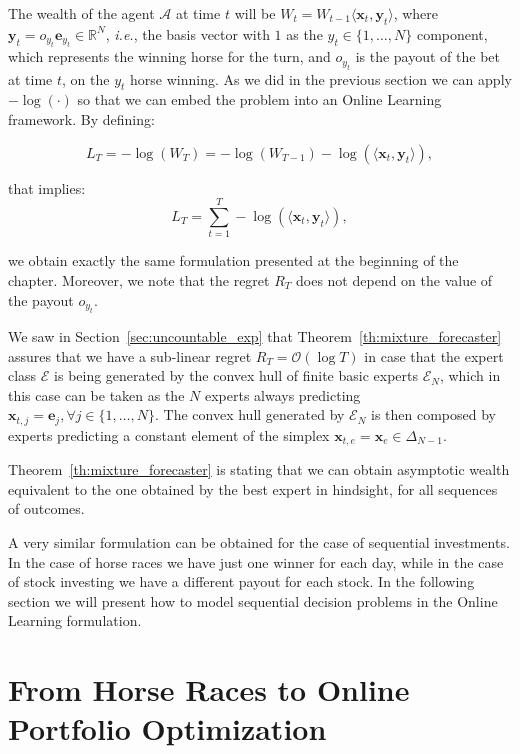 The wealth of the agent $\mathcal A$ at time $t$ will be $W_t=W_{t-1}\langle \mathbf x_t, \mathbf y_t \rangle$, where $\mathbf y_t=o_{y_t}\mathbf e_{y_t}\in\mathbb R^N$, \emph{i.e.}, the basis vector with $1$ as the $y_t\in\{1,\ldots,N\}$ component, which represents the winning horse for the turn, and $o_{y_t}$ is the payout of the bet at time $t$, on the $y_t$ horse winning. As we did in the previous section we can apply $-\log(\cdot)$ so that we can embed the problem into an Online Learning framework. By defining: 

$$L_T=-\log(W_T)=-\log(W_{T-1})-\log(\langle \mathbf x_t,\mathbf y_t\rangle),$$

that implies:
\begin{equation}\label{eq:log_loss_hr}
L_T=\sum\limits_{t=1}^T-\log(\langle \mathbf x_t,\mathbf y_t\rangle),
\end{equation}

we obtain exactly the same formulation presented at the beginning of the chapter. Moreover, we note that the regret $R_T$ does not 
depend on the value of the payout $o_{y_t}$. 

We saw in Section~\ref{sec:uncountable_exp} that Theorem~\ref{th:mixture_forecaster} assures that we have a sub-linear regret $R_T=\mathcal O(\log T)$ in case that the expert class $\mathcal E$ is being generated by the convex hull of finite basic experts $\mathcal E_N$, which in this case can be taken as the $N$ experts always predicting $\mathbf x_{t,j}=\mathbf e_j, \forall j\in\{1,\ldots,N\}$. The convex hull generated by $\mathcal E_N$ is then composed by experts predicting a constant element of the simplex $\mathbf x_{t,e}=\mathbf x_e\in \Delta_{N-1}$. 

Theorem~\ref{th:mixture_forecaster} is stating that we can obtain asymptotic wealth equivalent to the one obtained by the best expert in hindsight, for all sequences of outcomes. 

A very similar formulation can be obtained for the case of sequential investments. In the case of horse races we have just one winner for each day, while in the case of stock investing we have a different payout for each stock. In the following section we will present how to model sequential decision problems in the Online Learning formulation.

\section{From Horse Races to Online Portfolio Optimization}\label{sec:from_horse_to_ptf}


